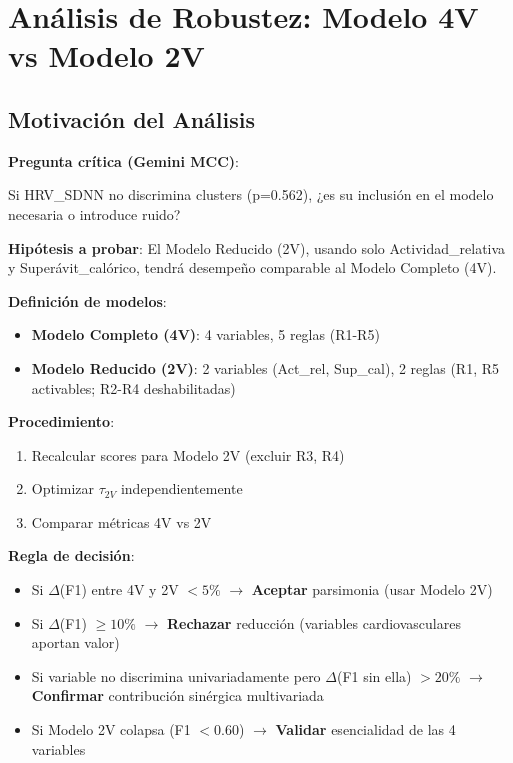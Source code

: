 \documentclass[12pt,letterpaper,twoside]{report}
\begin{document}
\section{Análisis de Robustez: Modelo 4V vs Modelo 2V}

\subsection{Motivación del Análisis}

\begin{hipotesisbox}
\textbf{Pregunta crítica (Gemini MCC)}:

Si HRV\_SDNN no discrimina clusters (p=0.562), ¿es su inclusión en el modelo necesaria o introduce ruido?

\textbf{Hipótesis a probar}: El Modelo Reducido (2V), usando solo Actividad\_relativa y Superávit\_calórico, tendrá desempeño comparable al Modelo Completo (4V).
\end{hipotesisbox}

\begin{estadisticobox}
\textbf{Definición de modelos}:

\begin{itemize}[noitemsep]
    \item \textbf{Modelo Completo (4V)}: 4 variables, 5 reglas (R1-R5)
    \item \textbf{Modelo Reducido (2V)}: 2 variables (Act\_rel, Sup\_cal), 2 reglas (R1, R5 activables; R2-R4 deshabilitadas)
\end{itemize}

\textbf{Procedimiento}:
\begin{enumerate}[noitemsep]
    \item Recalcular scores para Modelo 2V (excluir R3, R4)
    \item Optimizar $\tau_{2V}$ independientemente
    \item Comparar métricas 4V vs 2V
\end{enumerate}
\end{estadisticobox}

\begin{reglabox}
\textbf{Regla de decisión}:

\begin{itemize}[noitemsep]
    \item Si $\Delta$(F1) entre 4V y 2V $< 5\%$ $\to$ \textbf{Aceptar} parsimonia (usar Modelo 2V)
    \item Si $\Delta$(F1) $\geq 10\%$ $\to$ \textbf{Rechazar} reducción (variables cardiovasculares aportan valor)
    \item Si variable no discrimina univariadamente pero $\Delta$(F1 sin ella) $> 20\%$ $\to$ \textbf{Confirmar} contribución sinérgica multivariada
    \item Si Modelo 2V colapsa (F1 $< 0.60$) $\to$ \textbf{Validar} esencialidad de las 4 variables
\end{itemize}
\end{reglabox}
\end{document}
